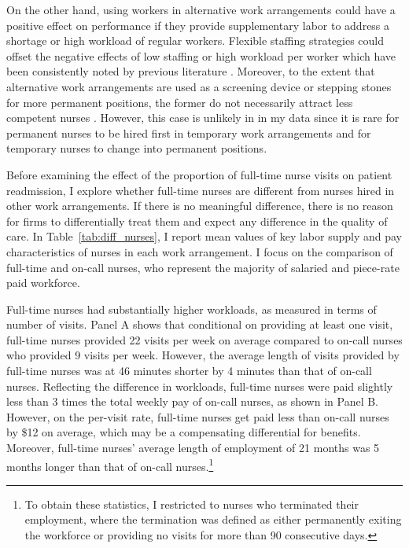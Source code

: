 \documentclass[final,12pt]{article}
\begin{document}
On the other hand, using workers in alternative work arrangements could have a positive effect on performance if they provide supplementary labor to address a shortage or high workload of regular workers.
Flexible staffing strategies could offset the negative effects of low staffing or high workload per worker which have been consistently noted by previous literature \citep{Aiken2010, Kuntz2014, BerryJaeker2016}.
Moreover, to the extent that alternative work arrangements are used as a screening device or stepping stones for more permanent positions, the former do not necessarily attract less competent nurses \citep{Booth2002}. However, this case is unlikely in in my data since it is rare for permanent nurses to be hired first in temporary work arrangements and for temporary nurses to change into permanent positions.


Before examining the effect of the proportion of full-time nurse visits on patient readmission, I explore whether full-time nurses are different from nurses hired in other work arrangements.
If there is no meaningful difference, there is no reason for firms to differentially treat them and expect any difference in the quality of care.
In Table~\ref{tab:diff_nurses}, I report mean values of key labor supply and pay characteristics of nurses in each work arrangement.
I focus on the comparison of full-time and on-call nurses, who represent the majority of salaried and piece-rate paid workforce.

Full-time nurses had substantially higher workloads, as measured in terms of number of visits.
Panel A shows that conditional on providing at least one visit, full-time nurses provided 22 visits per week on average compared to on-call nurses who provided 9 visits per week.
However, the average length of visits provided by full-time nurses was at 46 minutes shorter by 4 minutes than that of on-call nurses.
Reflecting the difference in workloads, full-time nurses were paid slightly less than 3 times the total weekly pay of on-call nurses, as shown in Panel B.
However, on the per-visit rate, full-time nurses get paid less than on-call nurses by \$12 on average, which may be a compensating differential for benefits.
Moreover, full-time nurses' average length of employment of 21 months was 5 months longer than that of on-call nurses.\footnote{To obtain these statistics, I restricted to nurses who terminated their employment, where the termination was defined as either permanently exiting the workforce or providing no visits for more than 90 consecutive days.}
\end{document}
